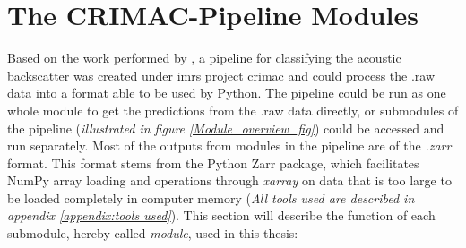         
        
        
        \section{The CRIMAC-Pipeline Modules}\label{CRIMAC-pipeline}
        Based on the work performed by \citeauthor{brautaset2020acoustic}\cite{brautaset2020acoustic}, a pipeline for classifying the acoustic backscatter was created under \gls{imr}s project \gls{crimac}\cite{crimac_pipeline} and could process the .raw data into a format able to be used by Python. The pipeline could be run as one whole module to get the predictions from the .raw data directly, or submodules of the pipeline (\textit{illustrated in figure \ref{Module_overview_fig}}) could be accessed and run separately. Most of the outputs from modules in the pipeline are of the \textit{.zarr} format. This format stems from the Python Zarr package, which facilitates NumPy array loading and operations through \textit{xarray} on data that is too large to be loaded completely in computer memory (\textit{All tools used are described in appendix \ref{appendix:tools used}}). This section will describe the function of each submodule, hereby called \textit{module}, used in this thesis:
   

        
